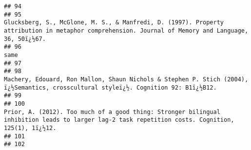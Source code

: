\documentclass[
  english,
  man]{apa6}
\begin{document}
\begin{verbatim}
## 94                                                                                                                                                                                                                                                                                                                     
## 95                                                                                                                                                                  Glucksberg, S., McGlone, M. S., & Manfredi, D. (1997). Property attribution in metaphor comprehension. Journal of Memory and Language, 36, 50ï¿½67.
## 96                                                                                                                                                                                                                                                                                                                 same
## 97                                                                                                                                                                                                                                                                                                                     
## 98                                                                                                                                                                                 Machery, Edouard, Ron Mallon, Shaun Nichols & Stephen P. Stich (2004), ï¿½Semantics, crosscultural styleï¿½. Cognition 92: B1ï¿½B12.
## 99                                                                                                                                                                                                                                                                                                                     
## 100                                                                                                                                                                   Prior, A. (2012). Too much of a good thing: Stronger bilingual inhibition leads to larger lag-2 task repetition costs. Cognition, 125(1), 1ï¿½12.
## 101                                                                                                                                                                                                                                                                                                                    
## 102                                                                                                                                                                                                                                                                                                                    

\end{verbatim}
\end{document}
